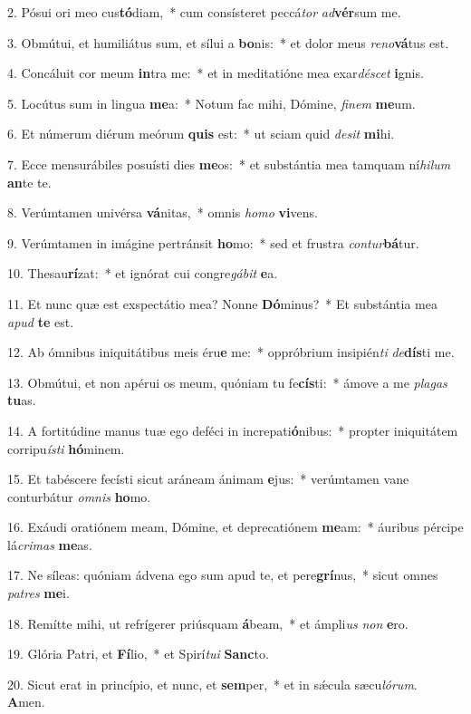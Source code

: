 2. Pósui ori meo cus\textbf{tó}diam,~*  cum consísteret peccá\textit{tor} \textit{ad}\textbf{vér}sum me.\

3. Obmútui, et humiliátus sum, et sílui a \textbf{bo}nis:~*  et dolor meus \textit{re}\textit{no}\textbf{vá}tus est.\

4. Concáluit cor meum \textbf{in}tra me:~*  et in meditatióne mea exar\textit{dé}\textit{scet} \textbf{i}gnis.\

5. Locútus sum in lingua \textbf{me}a:~*  Notum fac mihi, Dómine, \textit{fi}\textit{nem} \textbf{me}um.\

6. Et númerum diérum meórum \textbf{quis} est:~*  ut sciam quid \textit{de}\textit{sit} \textbf{mi}hi.\

7. Ecce mensurábiles posuísti dies \textbf{me}os:~*  et substántia mea tamquam ní\textit{hi}\textit{lum} \textbf{an}te te.\

8. Verúmtamen univérsa \textbf{vá}nitas,~*  omnis \textit{ho}\textit{mo} \textbf{vi}vens.\

9. Verúmtamen in imágine pertránsit \textbf{ho}mo:~*  sed et frustra \textit{con}\textit{tur}\textbf{bá}tur.\

10. Thesau\textbf{rí}zat:~*  et ignórat cui congre\textit{gá}\textit{bit} \textbf{e}a.\

11. Et nunc quæ est exspectátio mea? Nonne \textbf{Dó}minus?~*  Et substántia mea \textit{a}\textit{pud} \textbf{te} est.\

12. Ab ómnibus iniquitátibus meis éru\textbf{e} me:~*  oppróbrium insipién\textit{ti} \textit{de}\textbf{dís}ti me.\

13. Obmútui, et non apérui os meum, quóniam tu fe\textbf{cís}ti:~*  ámove a me \textit{pla}\textit{gas} \textbf{tu}as.\

14. A fortitúdine manus tuæ ego deféci in increpati\textbf{ó}nibus:~*  propter iniquitátem corripu\textit{ís}\textit{ti} \textbf{hó}minem.\

15. Et tabéscere fecísti sicut aráneam ánimam \textbf{e}jus:~*  verúmtamen vane conturbátur \textit{om}\textit{nis} \textbf{ho}mo.\

16. Exáudi oratiónem meam, Dómine, et deprecatiónem \textbf{me}am:~*  áuribus pércipe lá\textit{cri}\textit{mas} \textbf{me}as.\

17. Ne síleas: quóniam ádvena ego sum apud te, et pere\textbf{grí}nus,~*  sicut omnes \textit{pa}\textit{tres} \textbf{me}i.\

18. Remítte mihi, ut refrígerer priúsquam \textbf{á}beam,~*  et ámpli\textit{us} \textit{non} \textbf{e}ro.\

19. Glória Patri, et \textbf{Fí}lio,~*  et Spirí\textit{tu}\textit{i} \textbf{Sanc}to.\

20. Sicut erat in princípio, et nunc, et \textbf{sem}per,~*  et in sǽcula sæcu\textit{ló}\textit{rum}. \textbf{A}men.\

